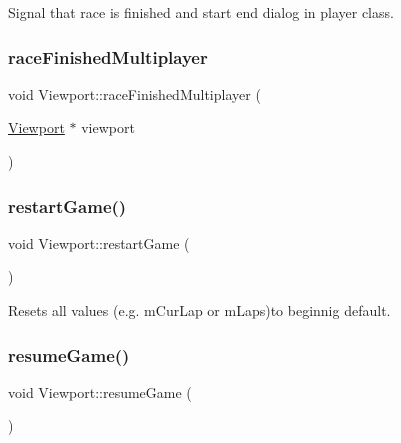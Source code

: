 Signal that race is finished and start end dialog in player class. 

\mbox{\label{class_viewport_a00e65ee2ec94764fb237b90462d540a5}} 
\subsubsection{\texorpdfstring{raceFinishedMultiplayer}{raceFinishedMultiplayer}}
{\footnotesize\ttfamily void Viewport\+::race\+Finished\+Multiplayer (\begin{DoxyParamCaption}\item[{\mbox{\hyperlink{class_viewport}{Viewport}} $\ast$}]{viewport }\end{DoxyParamCaption})\hspace{0.3cm}{\ttfamily [signal]}}

\mbox{\label{class_viewport_af4f56a75c3b96e1dd9d63bb469e3adc7}} 
\subsubsection{\texorpdfstring{restartGame()}{restartGame()}}
{\footnotesize\ttfamily void Viewport\+::restart\+Game (\begin{DoxyParamCaption}{ }\end{DoxyParamCaption})}



Resets all values (e.\+g. m\+Cur\+Lap or m\+Laps)to beginnig default. 

\mbox{\label{class_viewport_a42c6a6a3ae0978cb4fd35e0fc7eff894}} 
\subsubsection{\texorpdfstring{resumeGame()}{resumeGame()}}
{\footnotesize\ttfamily void Viewport\+::resume\+Game (\begin{DoxyParamCaption}{ }\end{DoxyParamCaption})}



